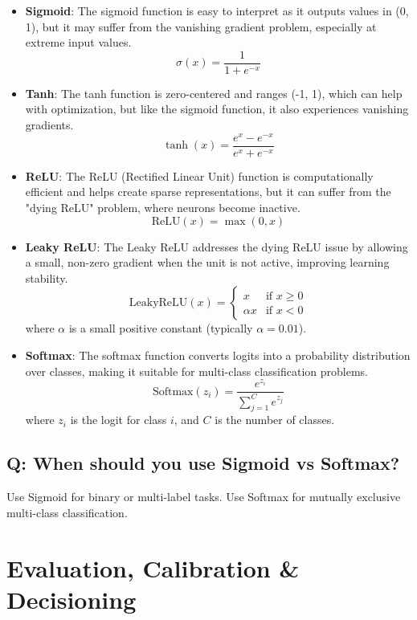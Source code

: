 \documentclass[11pt]{article}
\begin{document}
\begin{itemize}
	\item \textbf{Sigmoid}: The sigmoid function is easy to interpret as it outputs values in (0, 1), but it may suffer from the vanishing gradient problem, especially at extreme input values.
	      \[
		      \sigma(x) = \frac{1}{1 + e^{-x}}
	      \]

	\item \textbf{Tanh}: The tanh function is zero-centered and ranges (-1, 1), which can help with optimization, but like the sigmoid function, it also experiences vanishing gradients.
	      \[
		      \tanh(x) = \frac{e^x - e^{-x}}{e^x + e^{-x}}
	      \]

	\item \textbf{ReLU}: The ReLU (Rectified Linear Unit) function is computationally efficient and helps create sparse representations, but it can suffer from the "dying ReLU" problem, where neurons become inactive.
	      \[
		      \text{ReLU}(x) = \max(0, x)
	      \]

	\item \textbf{Leaky ReLU}: The Leaky ReLU addresses the dying ReLU issue by allowing a small, non-zero gradient when the unit is not active, improving learning stability.
	      \[
		      \text{LeakyReLU}(x) =
		      \begin{cases}
			      x        & \text{if } x \geq 0 \\
			      \alpha x & \text{if } x < 0
		      \end{cases}
	      \]
	      where \( \alpha \) is a small positive constant (typically \( \alpha = 0.01 \)).

	\item \textbf{Softmax}: The softmax function converts logits into a probability distribution over classes, making it suitable for multi-class classification problems.
	      \[
		      \text{Softmax}(z_i) = \frac{e^{z_i}}{\sum_{j=1}^{C} e^{z_j}}
	      \]
	      where \( z_i \) is the logit for class \( i \), and \( C \) is the number of classes.
\end{itemize}

\subsection*{Q: When should you use Sigmoid vs Softmax?}
Use Sigmoid for binary or multi-label tasks. Use Softmax for mutually exclusive multi-class classification.

\section{Evaluation, Calibration \& Decisioning}
\end{document}
